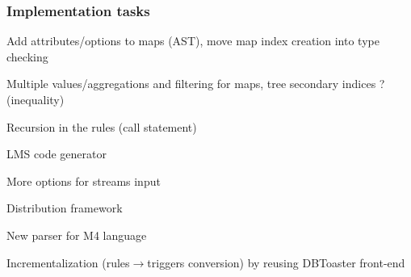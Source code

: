 \documentclass[10pt]{article}
\begin{document}
\subsubsection*{Implementation tasks}\ol
\item Add attributes/options to maps (AST), move map index creation into type checking
\item Multiple values/aggregations and filtering for maps, tree secondary indices ? (inequality)
\item Recursion in the rules (call statement)
\item LMS code generator
\item More options for streams input
\item Distribution framework
\item New parser for M4 language
\item Incrementalization (rules$\to$triggers conversion) by reusing DBToaster front-end
\ole

\newpage
\def\pdfurl#1{\href{#1}{\footnotesize pdf}}
{\small }
\end{document}
